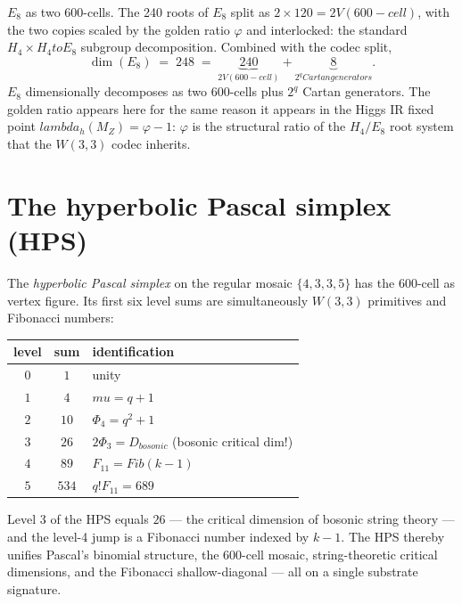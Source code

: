 \documentclass[11pt]{article}
\def\mathrm#1{#1}%
\def\mathbf#1{#1}%
\def\textbf#1{#1}%
\def\text#1{#1}%
\def\lambda{lambda}%
\def\mu{mu}%
\def\Phi#1{Phi#1}%
\def\cdot{ }%
\def\to{ to }%
\begin{document}
\textbf{$E_8$ as two 600-cells.} The 240 roots of $E_8$ split as $2 \times 120 = 2 \cdot V(\text{600-cell})$, with the two copies scaled by the golden ratio $\varphi$ and interlocked: the standard $H_4 \times H_4 \to E_8$ subgroup decomposition. Combined with the codec split,
\[
\boxed{\;\dim(E_8) \;=\; 248 \;=\; \underbrace{240}_{2 \cdot V(\text{600-cell})} + \underbrace{8}_{2^q \text{ Cartan generators}}.\;}
\]
$E_8$ dimensionally decomposes as two 600-cells plus $2^q$ Cartan generators. The golden ratio appears here for the same reason it appears in the Higgs IR fixed point $\lambda_h(M_Z) = \varphi - 1$: $\varphi$ is the structural ratio of the $H_4 / E_8$ root system that the $W(3,3)$ codec inherits.

\section{The hyperbolic Pascal simplex (HPS)}

\label{sec:hps}

The \emph{hyperbolic Pascal simplex} on the regular mosaic $\{4, 3, 3, 5\}$ has the 600-cell as vertex figure. Its first six level sums are simultaneously $W(3,3)$ primitives and Fibonacci numbers:

\begin{center}
\renewcommand{\arraystretch}{1.2}
\begin{tabular}{c c l}
\toprule
level & sum & identification \\
\midrule
$0$ & $1$ & unity \\
$1$ & $4$ & $\mu = q + 1$ \\
$2$ & $10$ & $\Phi_4 = q^2 + 1$ \\
$3$ & $26$ & $2\Phi_3 = D_{\text{bosonic}}$ (bosonic critical dim!) \\
$4$ & $89$ & $F_{11} = \mathrm{Fib}(k-1)$ \\
$5$ & $534$ & $q! \cdot F_{11} = 6 \cdot 89$ \\
\bottomrule
\end{tabular}
\end{center}

Level 3 of the HPS equals $\mathbf{26}$ --- the critical dimension of bosonic string theory --- and the level-4 jump is a Fibonacci number indexed by $k - 1$. The HPS thereby unifies Pascal's binomial structure, the 600-cell mosaic, string-theoretic critical dimensions, and the Fibonacci shallow-diagonal --- all on a single substrate signature.

\end{document}
